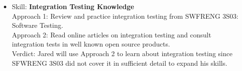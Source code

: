\documentclass[12pt, titlepage]{article}
\begin{document}
\begin{enumerate}
\begin{itemize}
			\item Skill: \textbf{Integration Testing Knowledge}
			\\Approach 1: Review and practice integration testing from SWFRENG 3S03: Software Testing.
			\\Approach 2: Read online articles on integration testing and consult integration tests in well known open source products.
			\\Verdict: Jared will use Approach 2 to learn about integration testing since SFWRENG 3S03 did not cover it in sufficient detail to expand his skills.
		\end{itemize}

	\end{enumerate}
		
	
\end{document}
